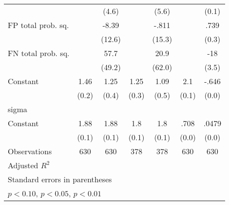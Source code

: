 {\begin{tabular}{l*{6}{c}}
                &                  &    (4.6)         &                  &    (5.6)         &                  &    (0.1)         \\
FP total prob. sq.&                  &    -8.39         &                  &    -.811         &                  &     .739\sym{**} \\
                &                  &   (12.6)         &                  &   (15.3)         &                  &    (0.3)         \\
FN total prob. sq.&                  &     57.7         &                  &     20.9         &                  &      -18\sym{***}\\
                &                  &   (49.2)         &                  &   (62.0)         &                  &    (3.5)         \\
Constant        &     1.46\sym{***}&     1.25\sym{***}&     1.25\sym{***}&     1.09\sym{**} &      2.1\sym{***}&    -.646\sym{***}\\
                &    (0.2)         &    (0.4)         &    (0.3)         &    (0.5)         &    (0.1)         &    (0.0)         \\
\hline
sigma           &                  &                  &                  &                  &                  &                  \\
Constant        &     1.88\sym{***}&     1.88\sym{***}&      1.8\sym{***}&      1.8\sym{***}&     .708\sym{***}&    .0479\sym{***}\\
                &    (0.1)         &    (0.1)         &    (0.1)         &    (0.1)         &    (0.0)         &    (0.0)         \\
\hline
Observations    &      630         &      630         &      378         &      378         &      630         &      630         \\
Adjusted \(R^{2}\)&                  &                  &                  &                  &                  &                  \\
\hline\hline
\multicolumn{7}{l}{\footnotesize Standard errors in parentheses}\\
\multicolumn{7}{l}{\footnotesize \sym{*} \(p<0.10\), \sym{**} \(p<0.05\), \sym{***} \(p<0.01\)}\\
\end{tabular}
}
